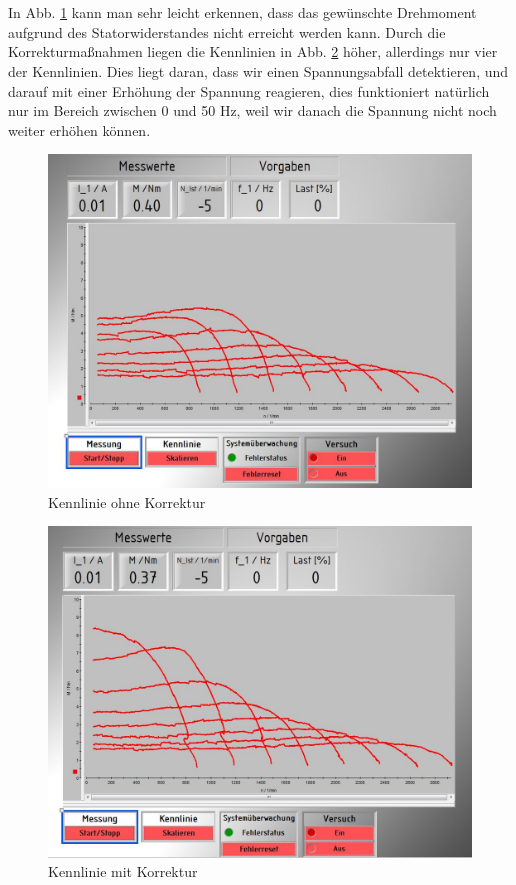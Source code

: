 \section{}\label{sec:aufg7d}
In Abb. \ref{fig:Kennlinie ohne Korrektur} kann man sehr leicht erkennen, dass das gewünschte Drehmoment aufgrund des Statorwiderstandes nicht erreicht werden kann. Durch die Korrekturmaßnahmen liegen die Kennlinien in Abb. \ref{fig:Kennlinie mit Korrektur} höher, allerdings nur vier der Kennlinien. Dies liegt daran, dass wir einen Spannungsabfall detektieren, und darauf mit einer Erhöhung der Spannung reagieren, dies funktioniert natürlich nur im Bereich zwischen 0 und 50 Hz, weil wir danach die Spannung nicht noch weiter erhöhen können.
\begin{figure}[htb]
\includegraphics[width=\textwidth]{./Bilder/Messung_Kennlinienfeld_ohne_Korrektur_A7}
\caption{Kennlinie ohne Korrektur}
\label{fig:Kennlinie ohne Korrektur}
\end{figure}
\begin{figure}[htb]
\includegraphics[width=\textwidth]{./Bilder/Messung_Kennlinienfeld_mit_Korrektur_A7}
\caption{Kennlinie mit Korrektur}
\label{fig:Kennlinie mit Korrektur}
\end{figure}
